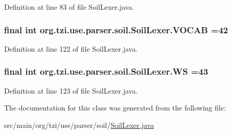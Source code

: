 Definition at line 83 of file Soil\-Lexer.\-java.

\hypertarget{classorg_1_1tzi_1_1use_1_1parser_1_1soil_1_1_soil_lexer_a33315cfdc8af4bf7fa8f90a16749c554}{
\subsubsection[{V\-O\-C\-A\-B}]{\setlength{\rightskip}{0pt plus 5cm}final int org.\-tzi.\-use.\-parser.\-soil.\-Soil\-Lexer.\-V\-O\-C\-A\-B =42\hspace{0.3cm}{\ttfamily [static]}}}\label{classorg_1_1tzi_1_1use_1_1parser_1_1soil_1_1_soil_lexer_a33315cfdc8af4bf7fa8f90a16749c554}


Definition at line 122 of file Soil\-Lexer.\-java.

\hypertarget{classorg_1_1tzi_1_1use_1_1parser_1_1soil_1_1_soil_lexer_ae03a9c8fefb04d1c90a500a2d1ffb670}{
\subsubsection[{W\-S}]{\setlength{\rightskip}{0pt plus 5cm}final int org.\-tzi.\-use.\-parser.\-soil.\-Soil\-Lexer.\-W\-S =43\hspace{0.3cm}{\ttfamily [static]}}}\label{classorg_1_1tzi_1_1use_1_1parser_1_1soil_1_1_soil_lexer_ae03a9c8fefb04d1c90a500a2d1ffb670}


Definition at line 123 of file Soil\-Lexer.\-java.



The documentation for this class was generated from the following file\-:\begin{DoxyCompactItemize}
\item 
src/main/org/tzi/use/parser/soil/\hyperlink{_soil_lexer_8java}{Soil\-Lexer.\-java}\end{DoxyCompactItemize}
